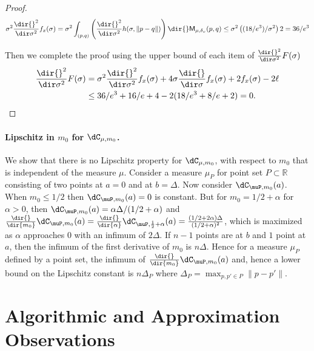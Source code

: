 \documentclass[11pt]{myclass}
\begin{document}
\begin{proof}
\[
\sigma^2 \frac{\dir{}^2}{\dir \sigma^2} f_x(\sigma) 
= 
\sigma^2    \int_{(p,q)} \left(\frac{\dir{}^2}{\dir \sigma^2} h(\sigma,\|p-q\|) \right) \dir{}\textsf{M}_{\mu,\delta_x}(p,q)
\leq
\sigma^2 \left((18/e^{3})/\sigma^2\right) 2
=36/e^3  
\]


Then we complete the proof using the upper bound of each item of $\frac{\dir{}^2}{\dir \sigma^2} F(\sigma)$
\begin{align*}
\frac{\dir{}^2}{\dir \sigma^2} F(\sigma) 
& = 
 \sigma^2 \frac{\dir{}^2}{\dir \sigma^2} f_x(\sigma)  +  4 \sigma \frac{\dir{}}{\dir \sigma} f_x(\sigma)  + 2 f_x(\sigma) - 2 \ell
 \\ & \leq 36/e^3 + 16/e + 4 - 2(18/e^3+8/e+2) = 0.  \qedhere
\end{align*}
\end{proof}

\paragraph{Lipschitz in $m_0$ for $\dC_{\mu,m_0}$.}
We show that there is no Lipschitz property for $\dC_{\mu,m_0}$, with respect to $m_0$ that is independent of the measure $\mu$.  
Consider a measure $\mu_P$ for point set $P \subset \mathbb{R}$ consisting of two points at $a = 0$ and at $b=\Delta$.
Now consider $\dC_{\muP,m_0}(a)$.  When $m_0 \leq 1/2$ then $\dC_{\muP,m_0}(a) =0$ is constant.  But for $m_0 = 1/2 + \alpha$ for $\alpha>0$, then $\dC_{\muP,m_0}(a) = \alpha\Delta/(1/2+\alpha)$ and 
$\frac{\dir{}}{\dir{m_0}} \dC_{\muP,m_0}(a) = \frac{\dir{}}{\dir{\alpha}} \dC_{\muP,\frac{1}{2}+\alpha}(a) = \frac{(1/2 + 2\alpha)\Delta}{(1/2 + \alpha)^2}$, which is maximized as $\alpha$ approaches $0$ with an infimum of $2\Delta$.  
If $n-1$ points are at $b$ and $1$ point at $a$, then the infimum of the first derivative of $m_0$ is $n\Delta$.  
Hence for a measure $\mu_P$ defined by a point set, the infimum of $\frac{\dir{}}{\dir{m_0}} \dC_{\muP,m_0}(a)$ and, hence a lower bound on the Lipschitz constant is $n \Delta_P$ where $\Delta_P = \max_{p,p' \in P} \|p-p'\|$.  









\section{Algorithmic and Approximation Observations}
\label{sec:algo}
\end{document}
